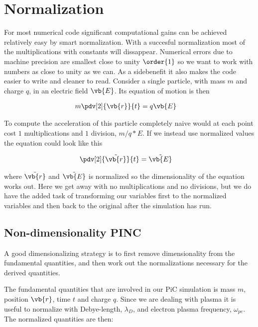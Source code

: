 \section{Normalization}
    For most numerical code significant computational gains can be achieved
    relatively easy by smart normalization. With a succesful normalization most
    of the multiplications with constants will dissappear. Numerical errors
    due to machine precision are smallest close to unity \(\order{1}\) \citep{hjorth-jensen_computational_????} so we
    want to work with numbers as close to unity as we can. As a sidebenefit it also
    makes the code easier to write and cleaner to read. Consider a single particle,
    with mass \(m\) and charge \(q\), in an electric field \(\vb{E}\). Its equation of motion is then

    \begin{align}
        m\pdv[2]{\vb{r}}{t} &= q\vb{E}
    \end{align}

    To compute the acceleration of this particle completely naive would at each point
    cost \(1\) multiplications and \(1\) division, \(m/q*E\). If we instead use normalized
    values the equation could look like this

    \begin{align}
        \pdv[2]{\tilde {\vb{r}}}{t} &= \tilde{\vb{E}}
    \end{align}

    where \(\tilde {\vb{r}}\) and \(\tilde{\vb{E}}\) is normalized so the dimensionality of the
    equation works out. Here we get away with no multiplications and no divisions,
    but we do have the added task of transforming our variables first to the normalized variables
    and then back to the original after the simulation has run.

    \subsection{Non-dimensionality PINC}
        A good dimensionalizing strategy is to first remove
        dimensionality from the fundamental quantities, and then work out the
        normalizations necessary for the derived quantities.

        The fundamental quantities that are involved in our PiC simulation is
        mass \(m\), position \(\vb{r}\), time \(t\) and charge \(q\). Since we are dealing with
        plasma it is useful to normalize with Debye-length, \(\lambda_D\), and electron plasma frequency, \(\omega_{pe}\).
        The normalized quantities are then:

